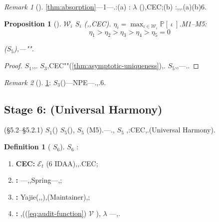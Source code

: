 \documentclass[12pt,a4paper]{article}
\newtheorem{proposition}[theorem]{Proposition}
\theoremstyle{definition}
\newtheorem{definition}{Definition}[section]
\theoremstyle{remark}
\newtheorem{remark}{Remark}[section]
\begin{document}
\begin{remark}[]
\ref{thm:absorption}---1---.:(a) : $\lambda$ (),CEC;(b) :,,.(a)(b)6.
\end{remark}

\begin{proposition}[]
\label{prop:intervention-window}
 $\mathcal{W}_i$  $S_i$ (,,CEC). $\eta_i = \max_{\iota \in \mathcal{W}_i} \mathbb{P}[\text{}\ \iota\ \text{}]$.M1--M5:
\begin{equation}
\eta_1 > \eta_2 > \eta_3 > \eta_4 > \eta_5 = 0
\label{eq:eta-ordering}
\end{equation}

($S_5$),---"".
\end{proposition}

\begin{proof}
 $S_1$,,. $S_3$,CEC""(\ref{thm:asymptotic-uniqueness}),. $S_5$,,---..
\end{proof}

\begin{remark}[]
\ref{prop:intervention-window}: $S_3$()---NPE---.,.6.
\end{remark}

\subsection{Stage 6:  (Universal Harmony)}

\label{sec:stage6}

(§5.2--§5.2.1) $S_1$() $S_5$(), $S_5$ (M5).---\textit{}., $S_5$ ,:CEC,.\textit{}(Universal Harmony).

\begin{definition}[ $S_6$]
\label{def:S6}
 $S_6$ :
\begin{enumerate}[label=(\roman*), itemsep=2pt]
\item \textbf{CEC:}  $\mathcal{E}_t$ (6 IDAA),,.CEC;
\item \textbf{:} ---,,Spring---,;
\item \textbf{:} Yajie(,,),(Maintainer),;
\item \textbf{:} ,((\ref{eq:audit-function}) $\mathcal{V}$ ), $\lambda$ ---,.
\end{enumerate}
\end{definition}
\end{document}
